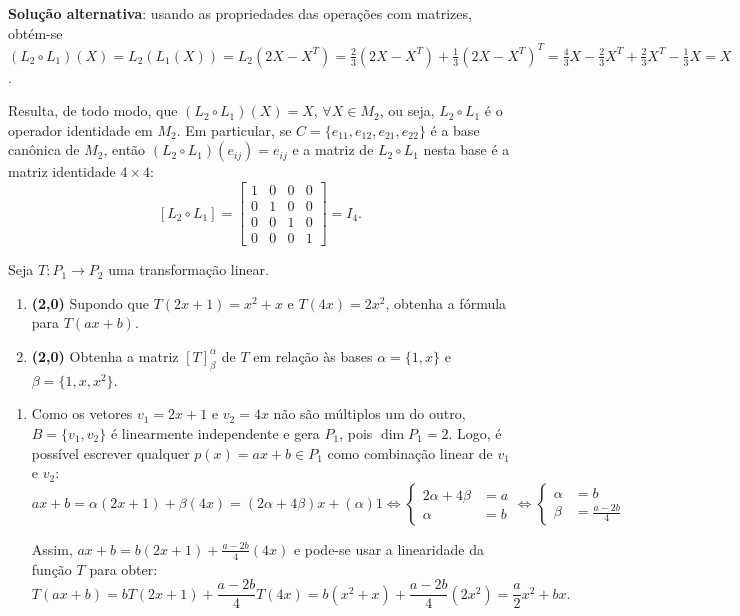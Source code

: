 \documentclass[12pt,a4paper]{article}
\begin{document}
\begin{ExerciseList}
\begin{enumerate}
\textbf{Solução alternativa}: usando as propriedades das operações com matrizes, obtém-se
$(L_2 \circ L_1)(X)
= L_2( L_1(X) )
= L_2(2X - X^T)
= \frac{2}{3}(2X - X^T) +\frac{1}{3}(2X - X^T)^T
= \frac{4}{3}X - \frac{2}{3}X^T +\frac{2}{3}X^T - \frac{1}{3}X
= X$.

Resulta, de todo modo, que $(L_2 \circ L_1) (X) = X$, $\forall X \in M_2$, ou seja, $L_2 \circ L_1$ é o operador identidade em $M_2$. Em particular, se $C = \{ e_{11}, e_{12}, e_{21}, e_{22} \}$ é a base canônica de $M_2$, então $(L_2 \circ L_1) (e_{ij}) = e_{ij}$ e a matriz de $L_2 \circ L_1$ nesta base é a matriz identidade $4 \times 4$:
\[
[L_2 \circ L_1] = \begin{bmatrix}
1 & 0 & 0 & 0\\
0 & 1 & 0 & 0\\
0 & 0 & 1 & 0\\
0 & 0 & 0 & 1
\end{bmatrix} = I_{4}.
\]
\end{enumerate}

\Exercise%
Seja $T: P_1 \to P_2$ uma transformação linear.
\begin{enumerate}
\item \textbf{(2,0)} Supondo que $T(2x+1) = x^2+x$ e $T(4x)= 2x^2$, obtenha a fórmula para $T(ax + b)$.
\item \textbf{(2,0)} Obtenha a matriz $[T]^\alpha_\beta$ de $T$ em relação às bases $\alpha = \{1, x\}$ e $\beta = \{1, x, x^2\}$.
\end{enumerate}
\Answer
\begin{enumerate}
\item Como os vetores $v_1 = 2x+1$ e $v_2 = 4x$ não são múltiplos um do outro, $B = \{v_1,v_2\}$ é linearmente independente e gera $P_1$, pois $\dim{P_1} = 2$. Logo, é possível escrever qualquer $p(x) = ax + b \in P_1$ como combinação linear de $v_1$ e $v_2$:
\[
ax + b
= \alpha(2x+1) + \beta(4x)
= (2\alpha + 4\beta)x + (\alpha)1
\Leftrightarrow
\begin{cases}
2\alpha + 4\beta &= a\\
\alpha &= b
\end{cases}
\Leftrightarrow
\begin{cases}
\alpha &= b\\
\beta  &= \frac{a-2b}{4}
\end{cases}
\]

Assim, $ax+b = b(2x+1) + \frac{a-2b}{4}(4x)$ e pode-se usar a linearidade da função $T$ para obter:
\[
T(ax+b)
= bT(2x+1) + \frac{a-2b}{4}T(4x)
= b(x^2+x) + \frac{a-2b}{4}(2x^2)
= \frac{a}{2}x^2 + bx.
\]


\end{enumerate}
\end{ExerciseList}
\end{document}
